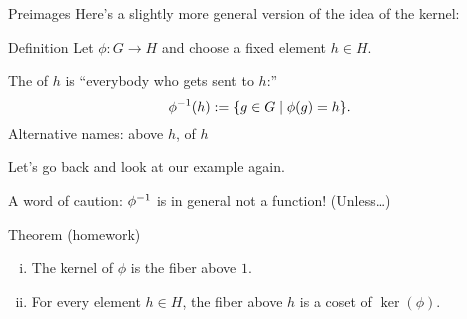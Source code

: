 \documentclass[8pt, handout]{beamer}
\begin{document}
\begin{frame}{Preimages}
  Here's a slightly more general version of the idea of the kernel:
  \begin{block}{Definition}
    Let $\phi:G\to H$ and choose a fixed element $h\in H$. 
    
    The  of $h$ is ``everybody who gets sent to $h$:''\pause
    \[\phi^{-1}(h) := \{g\in G\mid \phi(g) = h\}.\] \pause
    Alternative names:  above $h$,  of $h$
  \end{block} \pause
  Let's go back and look at our example again. \pause 
  \begin{alertblock}{A word of caution:}
    $\phi^{-1}$ is in general not a function! \pause (Unless\ldots)
  \end{alertblock} \pause
  \begin{exampleblock}{Theorem (homework)}
    \begin{enumerate}[(i)]
      \item The kernel of $\phi$ is the fiber above $1$. \pause
      \item For every element $h\in H$, the fiber above $h$ is a coset of $\ker(\phi)$.
    \end{enumerate}
    
  \end{exampleblock}
\end{frame}

\end{document}
